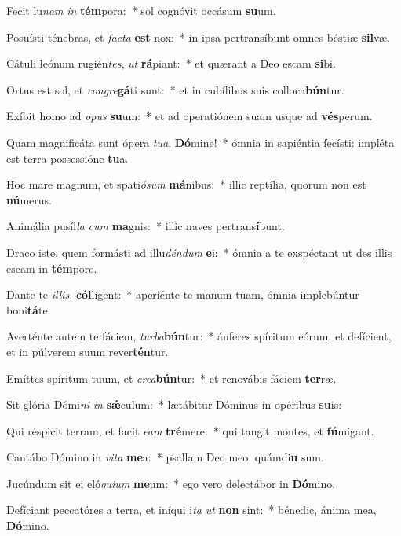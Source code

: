 \item Fecit lu\textit{nam} \textit{in} \textbf{tém}pora:~* sol cognóvit occásum \textbf{su}um.
\item Posuísti ténebras, et \textit{fac}\textit{ta} \textbf{est} nox:~* in ipsa pertransíbunt omnes béstiæ \textbf{sil}væ.
\item Cátuli leónum rugién\textit{tes}, \textit{ut} \textbf{rá}piant:~* et quærant a Deo escam \textbf{si}bi.
\item Ortus est sol, et \textit{con}\textit{gre}\textbf{gá}ti sunt:~* et in cubílibus suis colloca\textbf{bún}tur.
\item Exíbit homo ad \textit{o}\textit{pus} \textbf{su}um:~* et ad operatiónem suam usque ad \textbf{vés}perum.
\item Quam magnificáta sunt ópera \textit{tu}\textit{a}, \textbf{Dó}mine!~* ómnia in sapiéntia fecísti: impléta est terra possessióne \textbf{tu}a.
\item Hoc mare magnum, et spati\textit{ó}\textit{sum} \textbf{má}nibus:~* illic reptília, quorum non est \textbf{nú}merus.
\item Animália pusíl\textit{la} \textit{cum} \textbf{ma}gnis:~* illic naves pertrans\textbf{í}bunt.
\item Draco iste, quem formásti ad illu\textit{dén}\textit{dum} \textbf{e}i:~* ómnia a te exspéctant ut des illis escam in \textbf{tém}pore.
\item Dante te \textit{il}\textit{lis}, \textbf{cól}ligent:~* aperiénte te manum tuam, ómnia implebúntur boni\textbf{tá}te.
\item Averténte autem te fáciem, \textit{tur}\textit{ba}\textbf{bún}tur:~* áuferes spíritum eórum, et defícient, et in púlverem suum rever\textbf{tén}tur.
\item Emíttes spíritum tuum, et \textit{cre}\textit{a}\textbf{bún}tur:~* et renovábis fáciem \textbf{ter}ræ.
\item Sit glória Dómi\textit{ni} \textit{in} \textbf{sǽ}culum:~* lætábitur Dóminus in opéribus \textbf{su}is:
\item Qui réspicit terram, et facit \textit{e}\textit{am} \textbf{tré}mere:~* qui tangit montes, et \textbf{fú}migant.
\item Cantábo Dómino in \textit{vi}\textit{ta} \textbf{me}a:~* psallam Deo meo, quámdi\textbf{u} sum.
\item Jucúndum sit ei eló\textit{qui}\textit{um} \textbf{me}um:~* ego vero delectábor in \textbf{Dó}mino.
\item Defíciant peccatóres a terra, et iníqui i\textit{ta} \textit{ut} \textbf{non} sint:~* bénedic, ánima mea, \textbf{Dó}mino.
